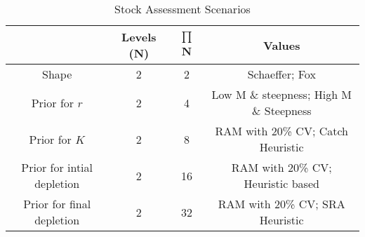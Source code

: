 \clearpage
\begin{table}
\label{tab:grid}
\caption{Stock Assessment Scenarios}  
\begin{center}
\label{tab:datasumm}
\begin{tabular}{|cccc|}
\hline
			& {\tiny Levels (N)} & {\tiny $\prod$ N} & {\tiny Values} \\ %
\hline\hline
{\tiny Shape } 		                 & {\tiny 2}  & {\tiny 2}  & {\tiny  Schaeffer; Fox}                          \\      
{\tiny Prior for $r$} 	             & {\tiny 2}  & {\tiny 4}  & {\tiny  Low M \& steepness; High M \& Steepness} \\  
{\tiny Prior for $K$}	             & {\tiny 2}  & {\tiny 8}  & {\tiny  RAM with 20\% CV; Catch Heuristic}       \\
{\tiny Prior for intial depletion}   & {\tiny 2}  & {\tiny 16} & {\tiny  RAM with 20\% CV; Heuristic based}       \\
{\tiny Prior for final depletion} 	 & {\tiny 2}  & {\tiny 32} & {\tiny  RAM with 20\% CV; SRA Heuristic}         \\
\hline
\end{tabular}
\end{center}
\end{table}

